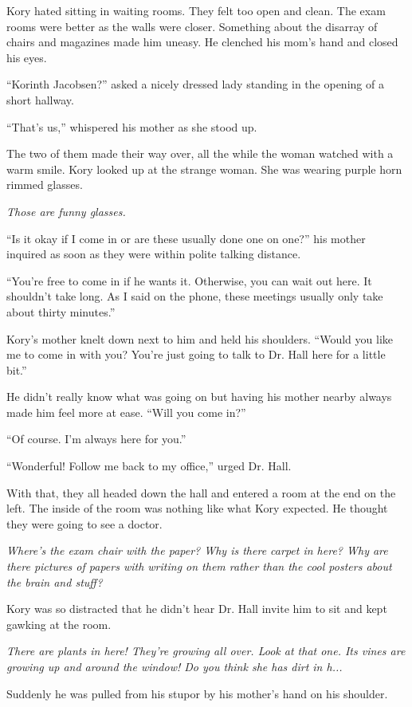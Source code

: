 \documentclass[9pt]{memoir}
\begin{document}
Kory hated sitting in waiting rooms. They felt too open and clean. The exam rooms were better as the walls were closer. Something about the disarray of chairs and magazines made him uneasy. He clenched his mom's hand and closed his eyes.

``Korinth Jacobsen?'' asked a nicely dressed lady standing in the opening of a short hallway.

``That's us,'' whispered his mother as she stood up.

The two of them made their way over, all the while the woman watched with a warm smile. Kory looked up at the strange woman. She was wearing purple horn rimmed glasses.

\textit{Those are funny glasses.}

``Is it okay if I come in or are these usually done one on one?'' his mother inquired as soon as they were within polite talking distance.

``You're free to come in if he wants it. Otherwise, you can wait out here. It shouldn't take long. As I said on the phone, these meetings usually only take about thirty minutes.''

Kory's mother knelt down next to him and held his shoulders. ``Would you like me to come in with you? You're just going to talk to Dr. Hall here for a little bit.''

He didn't really know what was going on but having his mother nearby always made him feel more at ease. ``Will you come in?''

``Of course. I'm always here for you.''

``Wonderful! Follow me back to my office,'' urged Dr. Hall.

With that, they all headed down the hall and entered a room at the end on the left. The inside of the room was nothing like what Kory expected. He thought they were going to see a doctor.

\textit{Where's the exam chair with the paper? Why is there carpet in here? Why are there pictures of papers with writing on them rather than the cool posters about the brain and stuff?}

Kory was so distracted that he didn't hear Dr. Hall invite him to sit and kept gawking at the room.

\textit{There are plants in here! They're growing all over. Look at that one. Its vines are growing up and around the window! Do you think she has dirt in h...}

Suddenly he was pulled from his stupor by his mother's hand on his shoulder.
\end{document}
